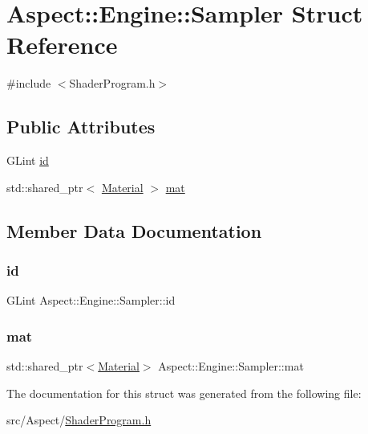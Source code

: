 \hypertarget{struct_aspect_1_1_engine_1_1_sampler}{}\section{Aspect\+:\+:Engine\+:\+:Sampler Struct Reference}
\label{struct_aspect_1_1_engine_1_1_sampler}


{\ttfamily \#include $<$Shader\+Program.\+h$>$}

\subsection*{Public Attributes}
\begin{DoxyCompactItemize}
\item 
G\+Lint \mbox{\hyperlink{struct_aspect_1_1_engine_1_1_sampler_a8b331dd0334126edee31cfa525101b66}{id}}
\item 
std\+::shared\+\_\+ptr$<$ \mbox{\hyperlink{class_aspect_1_1_engine_1_1_material}{Material}} $>$ \mbox{\hyperlink{struct_aspect_1_1_engine_1_1_sampler_acab2c584b4973154fe061a8398867de4}{mat}}
\end{DoxyCompactItemize}


\subsection{Member Data Documentation}
\mbox{\label{struct_aspect_1_1_engine_1_1_sampler_a8b331dd0334126edee31cfa525101b66}} 
\subsubsection{\texorpdfstring{id}{id}}
{\footnotesize\ttfamily G\+Lint Aspect\+::\+Engine\+::\+Sampler\+::id}

\mbox{\label{struct_aspect_1_1_engine_1_1_sampler_acab2c584b4973154fe061a8398867de4}} 
\subsubsection{\texorpdfstring{mat}{mat}}
{\footnotesize\ttfamily std\+::shared\+\_\+ptr$<$\mbox{\hyperlink{class_aspect_1_1_engine_1_1_material}{Material}}$>$ Aspect\+::\+Engine\+::\+Sampler\+::mat}



The documentation for this struct was generated from the following file\+:\begin{DoxyCompactItemize}
\item 
src/\+Aspect/\mbox{\hyperlink{_shader_program_8h}{Shader\+Program.\+h}}\end{DoxyCompactItemize}
